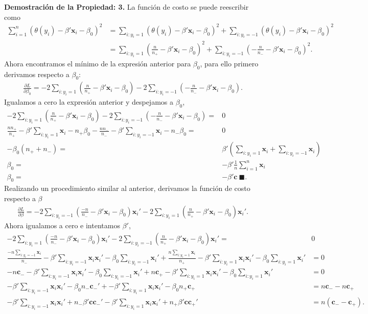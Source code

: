 \documentclass[paper=letter, fontsize=11pt]{scrartcl}
\newcommand{\finf}{\blacksquare.}
\newcommand{\cb}{\mathbf{c}}
\newcommand{\xb}{\mathbf{x}}
\newcommand{\sumi}{\sum_{i=1}^n}
\numberwithin{equation}{section} %
\numberwithin{figure}{section} %
\numberwithin{table}{section} %
\begin{document}
\textbf{Demostración de la Propiedad: 3.} La función de costo se puede reescribir como
\begin{align*}
    \sumi\left(\theta(y_i)-\beta'\xb_i-\beta_0 \right)^2&=\sum_{i:y_i=1}\left( \theta(y_i)-\beta'\xb_i-\beta_0\right)^2+ \sum_{i:y_i=-1}\left( \theta(y_i)-\beta'\xb_i-\beta_0\right)^2\\
    &=\sum_{i:y_i=1}\left(\frac{n}{n_+}-\beta'\xb_i-\beta_0\right)^2+ \sum_{i:y_i=-1}\left(-\frac{n}{n_-}-\beta'\xb_i-\beta_0\right)^2.
\end{align*}
Ahora encontramos el mínimo de la expresión anterior para $\beta_0$, para ello primero derivamos respecto a $\beta_0$:
\begin{align*}
    \frac{\partial L}{\partial \beta_0}=-2\sum_{i:y_i=1}\left(\frac{n}{n_+}-\beta'\xb_i-\beta_0\right)-2\sum_{i:y_i=-1}\left(-\frac{n}{n_-}-\beta'\xb_i-\beta_0\right).
\end{align*}
Igualamos a cero la expresión anterior y despejamos a $\beta_0$,
\begin{align*}
    -2\sum_{i:y_i=1}\left(\frac{n}{n_+}-\beta'\xb_i-\beta_0\right)-2\sum_{i:y_i=-1}\left(-\frac{n}{n_-}-\beta'\xb_i-\beta_0\right)=&0\\
    \frac{nn_+}{n_+}-\beta'\sum_{i:y_i=1}\xb_i-n_+\beta_0-\frac{nn_-}{n_-}-\beta'\sum_{i:y_i=-1}\xb_i-n_-\beta_0=&0\\
    -\beta_0(n_++n_-)=&\beta'\left(\sum_{i:y_i=1}\xb_i+\sum_{i:y_i=-1}\xb_i\right)\\
    \beta_0 =& -\beta'\frac{1}{n}\sumi \xb_i\\
    \beta_0 =& -\beta' \cb \ \finf
\end{align*}
Realizando un procedimiento similar al anterior, derivamos la función de costo respecto a $\beta$
\begin{align*}
    \frac{\partial L}{\partial \beta} = -2\sum_{i:y_i=-1}\left( \frac{-n}{n_-} -\beta'\xb_i-\beta_0\right)\xb_i'-2\sum_{i:y_i=1}\left( \frac{n}{n_+} -\beta'\xb_i-\beta_0\right)\xb_i'.
\end{align*}
Ahora igualamos a cero e intentamos $\beta'$,
\begin{align*}
-2\sum_{i:y_i=1}\left( \frac{-n}{n_-} -\beta'\xb_i-\beta_0\right)\xb_i'-2\sum_{i:y_i=-1}\left( \frac{n}{n_+} -\beta'\xb_i-\beta_0\right)\xb_i'=&0\\
\frac{-n\sum_{i:y_i=-1}\xb_i}{n_-}-\beta'\sum_{i:y_i=-1}\xb_i \xb_i'-\beta_0\sum_{i:y_i=-1}\xb_i'+\frac{n\sum_{i:y_i=1}\xb_i}{n_+}-\beta'\sum_{i:y_i=1}\xb_i \xb_i'-\beta_0\sum_{i:y_i=1}\xb_i'&=0\\
-n\cb_--\beta'\sum_{i:y_i=-1}\xb_i \xb_i'-\beta_0\sum_{i:y_i=-1}\xb_i'+n\cb_+-\beta'\sum_{i:y_i=1}\xb_i \xb_i'-\beta_0\sum_{i:y_i=1}\xb_i'&=0\\
-\beta'\sum_{i:y_i=-1}\xb_i \xb_i'-\beta_0 n_- \cb_-'+-\beta'\sum_{i:y_i=1}\xb_i \xb_i'-\beta_0 n_+ \cb_+&=n\cb_--n\cb_+\\
-\beta'\sum_{i:y_i=-1}\xb_i \xb_i'+n_-\beta'\cb\cb_-'-\beta'\sum_{i:y_i=1}\xb_i \xb_i' +n_+\beta'\cb\cb_+'&=n(\cb_--\cb_+).
\end{align*}
\end{document}
